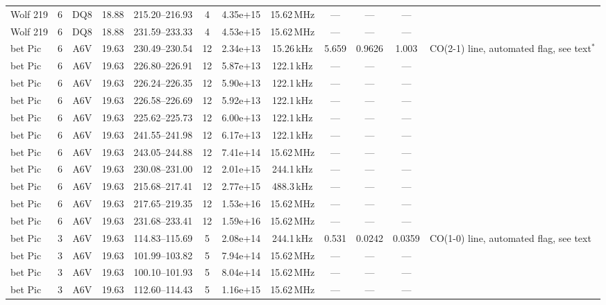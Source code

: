 \documentclass{openjournal}
\begin{document}
\begin{table}
\begin{tabularx}{\textwidth}{@{}l c c c c c c c c c c X@{}}
 Wolf  219 & 6 & DQ8 & 18.88 & 215.20--216.93 & 4 & 4.35e+15 & 15.62\,MHz & --- & --- & --- &  \\
 Wolf  219 & 6 & DQ8 & 18.88 & 231.59--233.33 & 4 & 4.53e+15 & 15.62\,MHz & --- & --- & --- &  \\
 bet Pic & 6 & A6V & 19.63 & 230.49--230.54 & 12 & 2.34e+13 & 15.26\,kHz & 5.659 & 0.9626 & 1.003 & CO(2-1) line, automated flag, see text$^{\ast}$ \\
 bet Pic & 6 & A6V & 19.63 & 226.80--226.91 & 12 & 5.87e+13 & 122.1\,kHz & --- & --- & --- &  \\
 bet Pic & 6 & A6V & 19.63 & 226.24--226.35 & 12 & 5.90e+13 & 122.1\,kHz & --- & --- & --- &  \\
 bet Pic & 6 & A6V & 19.63 & 226.58--226.69 & 12 & 5.92e+13 & 122.1\,kHz & --- & --- & --- &  \\
 bet Pic & 6 & A6V & 19.63 & 225.62--225.73 & 12 & 6.00e+13 & 122.1\,kHz & --- & --- & --- &  \\
 bet Pic & 6 & A6V & 19.63 & 241.55--241.98 & 12 & 6.17e+13 & 122.1\,kHz & --- & --- & --- &  \\
 bet Pic & 6 & A6V & 19.63 & 243.05--244.88 & 12 & 7.41e+14 & 15.62\,MHz & --- & --- & --- &  \\
 bet Pic & 6 & A6V & 19.63 & 230.08--231.00 & 12 & 2.01e+15 & 244.1\,kHz & --- & --- & --- &  \\
 bet Pic & 6 & A6V & 19.63 & 215.68--217.41 & 12 & 2.77e+15 & 488.3\,kHz & --- & --- & --- &  \\
 bet Pic & 6 & A6V & 19.63 & 217.65--219.35 & 12 & 1.53e+16 & 15.62\,MHz & --- & --- & --- &  \\
 bet Pic & 6 & A6V & 19.63 & 231.68--233.41 & 12 & 1.59e+16 & 15.62\,MHz & --- & --- & --- &  \\
 bet Pic & 3 & A6V & 19.63 & 114.83--115.69 & 5 & 2.08e+14 & 244.1\,kHz & 0.531 & 0.0242 & 0.0359 & CO(1-0) line, automated flag, see text \\
 bet Pic & 3 & A6V & 19.63 & 101.99--103.82 & 5 & 7.94e+14 & 15.62\,MHz & --- & --- & --- &  \\
 bet Pic & 3 & A6V & 19.63 & 100.10--101.93 & 5 & 8.04e+14 & 15.62\,MHz & --- & --- & --- &  \\
 bet Pic & 3 & A6V & 19.63 & 112.60--114.43 & 5 & 1.16e+15 & 15.62\,MHz & --- & --- & --- &  \\
\hline
\end{tabularx}
\end{table}
\end{document}
